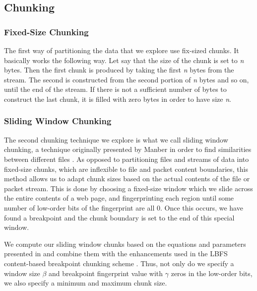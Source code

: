 \subsection{Chunking}
\label{sec:chunking}
\subsubsection{Fixed-Size Chunking}
The first way of partitioning the data that we explore use fix-sized chunks. It basically works the following way. Let say
that the size of the chunk is set to \textit{n} bytes. Then the first chunk is produced by taking the first \textit{n}
bytes from the stream. The second is constructed from the second portion of \textit{n} bytes and so on, until the end of
the stream. If there is not a sufficient number of bytes to construct the last chunk, it is filled with zero bytes in order
to have size \textit{n}.

\subsubsection{Sliding Window Chunking}
The second chunking technique we explore is what we call sliding window chunking, a technique originally presented by Manber in order to find similarities between different files \cite{manber}. As opposed to partitioning files and streams of data into fixed-size chunks, which are inflexible to file and packet content boundaries, this method allows us to adapt chunk sizes based on the actual contents of the file or packet stream. This is done by choosing a fixed-size window which we slide across the entire contents of a web page, and fingerprinting each region until some number of low-order bits of the fingerprint are all 0. Once this occurs, we have found a breakpoint and the chunk boundary is set to the end of this special window. 

We compute our sliding window chunks based on the equations and parameters presented in \cite{spring} and combine them with the enhancements used in the LBFS content-based breakpoint chunking scheme \cite{lbfs}. Thus, not only do we specify a window size $\beta$ and breakpoint fingerprint value with $\gamma$ zeros in the low-order bits, we also specify a minimum and maximum chunk size. 

